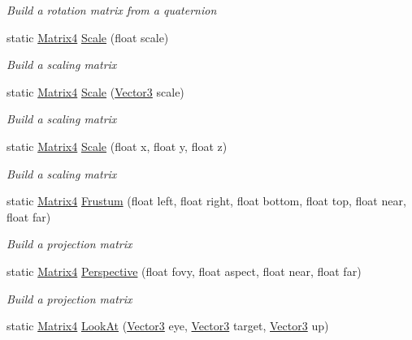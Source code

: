 \begin{DoxyCompactItemize}
\begin{DoxyCompactList}\small\item\em Build a rotation matrix from a quaternion \end{DoxyCompactList}\item 
static \hyperlink{struct_open_t_k_1_1_matrix4}{Matrix4} \hyperlink{struct_open_t_k_1_1_matrix4_a9ed149b8e6433262b9bad481f20bc92f}{Scale} (float scale)
\begin{DoxyCompactList}\small\item\em Build a scaling matrix \end{DoxyCompactList}\item 
static \hyperlink{struct_open_t_k_1_1_matrix4}{Matrix4} \hyperlink{struct_open_t_k_1_1_matrix4_af737c5258598885a21e4061503b88b18}{Scale} (\hyperlink{struct_open_t_k_1_1_vector3}{Vector3} scale)
\begin{DoxyCompactList}\small\item\em Build a scaling matrix \end{DoxyCompactList}\item 
static \hyperlink{struct_open_t_k_1_1_matrix4}{Matrix4} \hyperlink{struct_open_t_k_1_1_matrix4_ae4e10621781c31a829b844bd9dd36717}{Scale} (float x, float y, float z)
\begin{DoxyCompactList}\small\item\em Build a scaling matrix \end{DoxyCompactList}\item 
static \hyperlink{struct_open_t_k_1_1_matrix4}{Matrix4} \hyperlink{struct_open_t_k_1_1_matrix4_ad39000b80d53e4c3b571bb0dbf3defaf}{Frustum} (float left, float right, float bottom, float top, float near, float far)
\begin{DoxyCompactList}\small\item\em Build a projection matrix \end{DoxyCompactList}\item 
static \hyperlink{struct_open_t_k_1_1_matrix4}{Matrix4} \hyperlink{struct_open_t_k_1_1_matrix4_a83cf01c11a58da7c2a3df2bc7098ca13}{Perspective} (float fovy, float aspect, float near, float far)
\begin{DoxyCompactList}\small\item\em Build a projection matrix \end{DoxyCompactList}\item 
static \hyperlink{struct_open_t_k_1_1_matrix4}{Matrix4} \hyperlink{struct_open_t_k_1_1_matrix4_a87e3d4f4c7db7d876d3856d30b1dd4b2}{Look\-At} (\hyperlink{struct_open_t_k_1_1_vector3}{Vector3} eye, \hyperlink{struct_open_t_k_1_1_vector3}{Vector3} target, \hyperlink{struct_open_t_k_1_1_vector3}{Vector3} up)

\end{DoxyCompactItemize}
